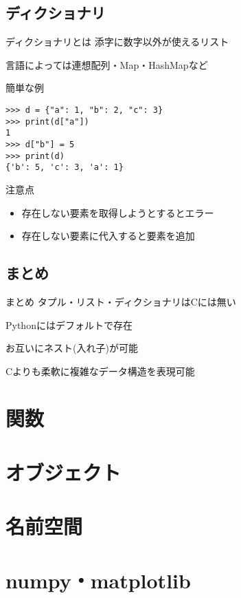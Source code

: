 \documentclass[12pt, xetex, xcolor=pdftex, dvipsnames]{beamer}
\begin{document}
\subsection{ディクショナリ}
\begin{frame}{ディクショナリとは}
    添字に数字以外が使えるリスト

    言語によっては連想配列・Map・HashMapなど  
\end{frame}
\begin{frame}[fragile]{簡単な例}
    \begin{lstlisting}
>>> d = {"a": 1, "b": 2, "c": 3}
>>> print(d["a"])
1
>>> d["b"] = 5
>>> print(d)
{'b': 5, 'c': 3, 'a': 1}
    \end{lstlisting}
\end{frame}
\begin{frame}{注意点}
    \begin{itemize}
        \item 存在しない要素を取得しようとするとエラー
        \item 存在しない要素に代入すると要素を追加
    \end{itemize}
\end{frame}
\subsection{まとめ}
\begin{frame}{まとめ}
    タプル・リスト・ディクショナリはCには無い

    Pythonにはデフォルトで存在

    お互いにネスト(入れ子)が可能

    \alert{Cよりも柔軟に複雑なデータ構造を表現可能}
\end{frame}

\section{関数}

\section{オブジェクト}

\section{名前空間}

\section{numpy・matplotlib}
\end{document}
